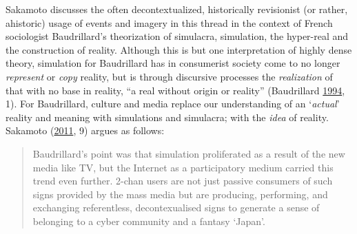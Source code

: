 \documentclass[10pt,british,A4paper,twoside]{memoir}
\begin{document}
Sakamoto discusses the often decontextualized, historically revisionist
(or rather, ahistoric) usage of events and imagery in this thread in the
context of French sociologist Baudrillard's theorization of simulacra,
simulation, the hyper-real and the construction of reality. Although
this is but one interpretation of highly dense theory, simulation for
Baudrillard has in consumerist society come to no longer
\emph{represent} or \emph{copy} reality, but is through discursive
processes the \emph{realization} of that with no base in reality, ``a
real without origin or reality'' (Baudrillard
\protect\hyperlink{ref-baudrillard_simulacra_1994}{1994}, 1). For
Baudrillard, culture and media replace our understanding of an
`\emph{actual}' reality and meaning with simulations and simulacra; with
the \emph{idea} of reality. Sakamoto
(\protect\hyperlink{ref-sakamoto_koreans_2011}{2011}, 9) argues as
follows:

\begin{quote}
Baudrillard's point was that simulation proliferated as a result of the
new media like TV, but the Internet as a participatory medium carried
this trend even further. 2-chan users are not just passive consumers of
such signs provided by the mass media but are producing, performing, and
exchanging referentless, decontexualised signs to generate a sense of
belonging to a cyber community and a fantasy `Japan'.
\end{quote}
\end{document}
